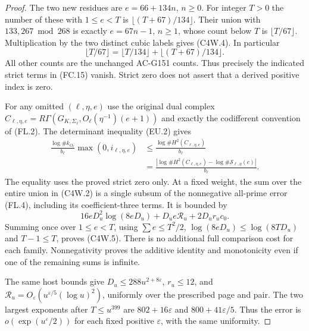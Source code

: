 \begin{proof}
The two new residues are $e=66+134n$, $n\geq0$.
For integer $T>0$ the number of these with $1\leq e<T$ is
$\lfloor(T+67)/134\rfloor$.
Their union with $133,267\bmod268$ is exactly $e=67n-1$,
$n\geq1$, whose count below $T$ is $\lfloor T/67\rfloor$.
Multiplication by the two distinct cubic labels gives (C4W.4).
In particular
\[
 \lfloor T/67\rfloor=\lfloor T/134\rfloor
                          +\lfloor(T+67)/134\rfloor.
 \tag{C4W.7}
\]
All other counts are the unchanged AC-G151 counts.
Thus precisely the indicated strict terms in (FC.15) vanish.
Strict zero does not assert that a derived positive index is zero.

For any omitted $(\ell,\eta,e)$ use the original dual complex
$C_{\ell,\eta,e}=R\Gamma(G_{K,\Sigma_\ell},
O_\ell(\eta^{-1})(e+1))$ and exactly the codifferent convention
of (FL.2).  The determinant inequality (EU.2) gives
\[
 \begin{aligned}
 \frac{\log\#k_{O_\ell}}{b_\ell}\max(0,i_{\ell,\eta,e})
 &\leq\frac{\log\#H^2(C_{\ell,\eta,e})}{b_\ell}\\
 &=\frac{|\log\#H^2(C_{\ell,\eta,e})
                    -\log\#\mathcal S_{\ell,\eta}(e)|}{b_\ell}.
 \end{aligned}
 \tag{C4W.8}
\]
The equality uses the proved strict zero only.
At a fixed weight, the sum over the entire union in (C4W.2)
is a single subsum of the nonnegative all-prime error (FL.4),
including its coefficient-three terms.  It is bounded by
\[
       16eD_u^2\log(8eD_u)+D_ue\mathcal R_u+2D_ur_uc_0.
 \tag{C4W.9}
\]
Summing once over $1\leq e<T$, using $\sum e\leq T^2/2$,
$\log(8eD_u)\leq\log(8TD_u)$ and $T-1\leq T$, proves (C4W.5).
There is no additional full comparison cost for each family.
Nonnegativity proves the additive identity and monotonicity even
if one of the remaining sums is infinite.

The same host bounds give $D_u\leq288u^{2+8\varepsilon}$,
$r_u\leq12$, and
$\mathcal R_u=O_\varepsilon(u^{\varepsilon/5}(\log u)^2)$,
uniformly over the prescribed page and pair.
The two largest exponents after $T\leq u^{399}$ are
$802+16\varepsilon$ and $800+41\varepsilon/5$.
Thus the error is $o(\exp(u^\varepsilon/2))$ for each fixed
positive $\varepsilon$, with the same uniformity.


\end{proof}
